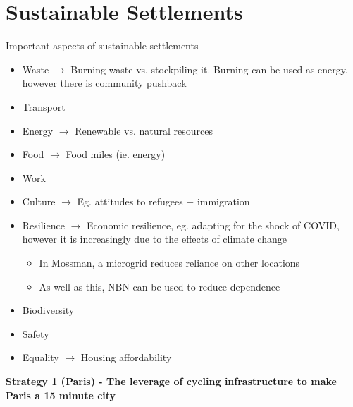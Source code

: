 \section{Sustainable Settlements} \label{07/04/2025}

	Important aspects of sustainable settlements

	\begin{itemize}
		\item Waste $\rightarrow$ Burning waste vs. stockpiling it. Burning can be used as energy, however there is community pushback
		\item Transport
		\item Energy $\rightarrow$ Renewable vs. natural resources
		\item Food $\rightarrow$ Food miles (ie. energy)
		\item Work
		\item Culture $\rightarrow$ Eg. attitudes to refugees + immigration
		\item Resilience $\rightarrow$ Economic resilience, eg. adapting for the shock of COVID, however it is increasingly due to the effects of climate change
			\begin{itemize}
				\item In Mossman, a microgrid reduces reliance on other locations
				\item As well as this, NBN can be used to reduce dependence
			\end{itemize}
		\item Biodiversity
		\item Safety
		\item Equality $\rightarrow$ Housing affordability
	\end{itemize}

	\newpage

	\textbf{Strategy 1 (Paris) - The leverage of cycling infrastructure to make Paris a 15 minute city}
	
